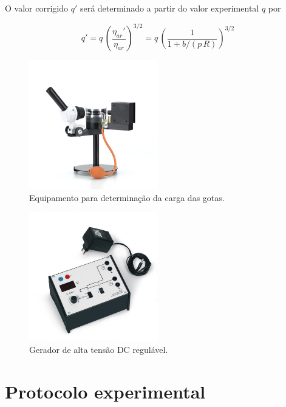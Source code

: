 \documentclass[a4paper,twoside,12pt]{article}      %
\begin{document}
O valor corrigido $q'$ será  determinado a partir do valor experimental $q$ por

\begin{equation}
	\label{eq:correcao1}
	q' = q\, \left(\frac{\eta_{ar}'}{\eta_{ar}}\right)^{3/2}  =q\, \left(\frac{1}{1 + b/(p\,R)}\right)^{3/2}  
\end{equation}

\begin{figure}
	[htb]  \centering 
	\includegraphics[width=0.5\textwidth]{./U131001_01_Aparelho-de-Millikan}
	\caption{Equipamento para determinação da carga das gotas. \label{fig:Equi}} 
\end{figure}

\begin{figure}
	[htb]  \centering 
	\includegraphics[width=0.5\textwidth]{./U13105-230_01_Aparelho-operacional-de-Millikan}
	\caption{Gerador de alta tensão DC regulável. \label{fig:fonteDC_HT}} 
\end{figure}


\newpage
\section{\sf Protocolo experimental}
\end{document}

